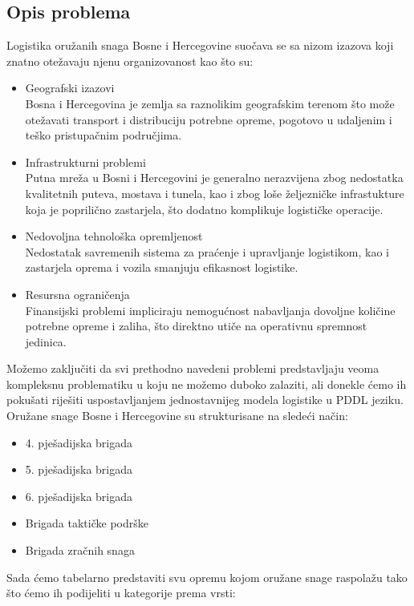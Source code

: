 \documentclass{article}
\begin{document}
\subsection{Opis problema}
Logistika oružanih snaga Bosne i Hercegovine suočava se sa nizom izazova koji znatno otežavaju njenu organizovanost kao što su:
\begin{itemize}
    \item Geografski izazovi
    \\Bosna i Hercegovina je zemlja sa raznolikim geografskim terenom što može otežavati transport i distribuciju potrebne opreme, pogotovo u udaljenim i teško pristupačnim područjima. 
    \item Infrastrukturni problemi
    \\Putna mreža u Bosni i Hercegovini je generalno nerazvijena zbog nedostatka kvalitetnih puteva, mostava i tunela, kao i zbog loše željezničke infrastukture koja je poprilično zastarjela, što dodatno komplikuje logističke operacije.
    \item Nedovoljna tehnološka opremljenost
    \\Nedostatak savremenih sistema za praćenje i upravljanje logistikom, kao i zastarjela oprema i vozila smanjuju efikasnost logistike.
    \item Resursna ograničenja
    \\Finansijski problemi impliciraju nemogućnost nabavljanja dovoljne količine potrebne opreme i zaliha, što direktno utiče na operativnu spremnost jedinica.
\end{itemize}
Možemo zaključiti da svi prethodno navedeni problemi predstavljaju veoma kompleksnu problematiku u koju ne možemo duboko zalaziti, ali donekle ćemo ih pokušati riješiti uspostavljanjem jednostavnijeg modela logistike u PDDL jeziku.
\\Oružane snage Bosne i Hercegovine su strukturisane na sledeći način:
\begin{itemize}
    \item 4. pješadijska brigada
    \item 5. pješadijska brigada
    \item 6. pješadijska brigada
    \item Brigada taktičke podrške
    \item Brigada zračnih snaga\\
\end{itemize}
Sada ćemo tabelarno predstaviti svu opremu kojom oružane snage raspolažu tako što ćemo ih podijeliti u kategorije prema vrsti:\\\\
\end{document}
